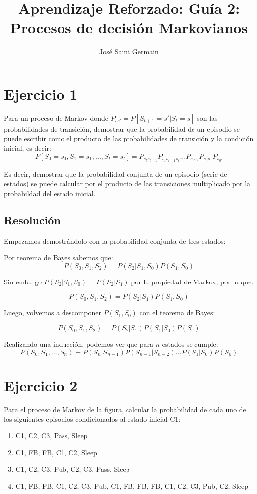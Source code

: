 \documentclass[12pt,a4paper]{article}
\title{Aprendizaje Reforzado: Guía 2: Procesos de decisión Markovianos}
\author{José Saint Germain}
\begin{document}
\maketitle

\section{Ejercicio 1}

Para un proceso de Markov donde $P_{ss'} = P[S_{t+1} = s' | S_t = s]$ 
son las probabilidades de transición, demostrar que la probabilidad de un
episodio se puede escribir como el producto de las probabilidades de transición
y la condición inicial, es decir:
$$P[S_0=s_0, S_1=s_1, ..., S_t=s_t] = P_{s_{t}s_{t+1}} P_{s_{t}s_{t-1}s_t} \dots P_{s_1 s_2}P_{s_0 s_1}P_{s_{0'}}$$

Es decir, demostrar que la probabilidad conjunta de un episodio (serie de estados)
se puede calcular por el producto de las transiciones multiplicado por la probabildad
del estado inicial.

\subsection{Resolución}

Empezamos demostrándolo con la probabilidad conjunta de tres estados:

Por teorema de Bayes sabemos que:
$$ P(S_0,S_1,S_2) = P(S_2|S_1,S_0)P(S_1,S_0) $$

Sin embargo $P(S_2|S_1,S_0) = P(S_2|S_1)$ por la propiedad de Markov, por lo que:

$$ P(S_0,S_1,S_2) = P(S_2|S_1)P(S_1,S_0) $$

Luego, volvemos a descomponer $P(S_1,S_0)$ con el teorema de Bayes:

$$ P(S_0,S_1,S_2) = P(S_2|S_1)P(S_1|S_0)P(S_0) $$

Realizando una inducción, podemos ver que para $n$ estados se cumple:
$$ P(S_0,S_1,...,S_n) = P(S_n|S_{n-1})P(S_{n-1}|S_{n-2})...P(S_1|S_0)P(S_0) $$

\section{Ejercicio 2}

Para el proceso de Markov de la figura, calcular la probabilidad de
cada uno de los siguientes episodios condicionados al estado inicial C1:

\begin{enumerate}
    \item C1, C2, C3, Pass, Sleep
    \item C1, FB, FB, C1, C2, Sleep
    \item C1, C2, C3, Pub, C2, C3, Pass, Sleep
    \item C1, FB, FB, C1, C2, C3, Pub, C1, FB, FB, FB, C1, C2, C3, Pub, C2, Sleep
\end{enumerate}
\end{document}

